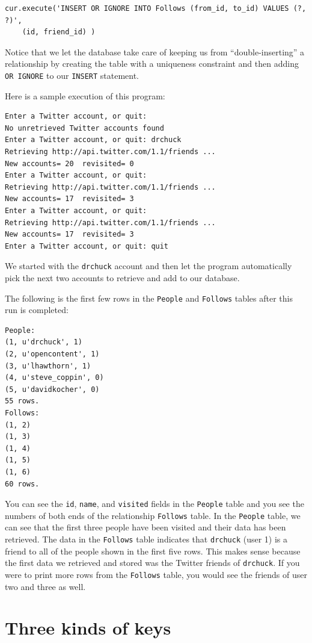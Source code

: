 \beforeverb
\begin{verbatim}
cur.execute('INSERT OR IGNORE INTO Follows (from_id, to_id) VALUES (?, ?)',
    (id, friend_id) )
\end{verbatim}
\afterverb
%
Notice that we let the database take care of keeping us from ``double-inserting''
a relationship by creating the table with a uniqueness constraint and then
adding {\tt OR IGNORE} to our {\tt INSERT} statement.

Here is a sample execution of this program:

\beforeverb
\begin{verbatim}
Enter a Twitter account, or quit: 
No unretrieved Twitter accounts found
Enter a Twitter account, or quit: drchuck
Retrieving http://api.twitter.com/1.1/friends ...
New accounts= 20  revisited= 0
Enter a Twitter account, or quit: 
Retrieving http://api.twitter.com/1.1/friends ...
New accounts= 17  revisited= 3
Enter a Twitter account, or quit: 
Retrieving http://api.twitter.com/1.1/friends ...
New accounts= 17  revisited= 3
Enter a Twitter account, or quit: quit
\end{verbatim}
\afterverb
%
We started with the {\tt drchuck} account and then let the program
automatically pick the next two accounts to retrieve and add to 
our database.

The following is the first few rows in the {\tt People} 
and {\tt Follows} tables after this run is completed:

\beforeverb
\begin{verbatim}
People:
(1, u'drchuck', 1)
(2, u'opencontent', 1)
(3, u'lhawthorn', 1)
(4, u'steve_coppin', 0)
(5, u'davidkocher', 0)
55 rows.
Follows:
(1, 2)
(1, 3)
(1, 4)
(1, 5)
(1, 6)
60 rows.
\end{verbatim}
\afterverb
%
You can see the {\tt id}, {\tt name}, and {\tt visited} fields in the 
{\tt People} table and you see the numbers of both ends of 
the relationship {\tt Follows} table.   
In the {\tt People} table, we can see that the first three people
have been visited and their data has been retrieved.
The data in the {\tt Follows} table indicates that
{\tt drchuck} (user 1) is a friend to all of the people shown in the first
five rows.  This makes sense because
the first data we retrieved and stored was the Twitter friends of
{\tt drchuck}.  If you were to print more rows from the {\tt Follows} table,
you would see the friends of user two and three as well.

\section{Three kinds of keys}

